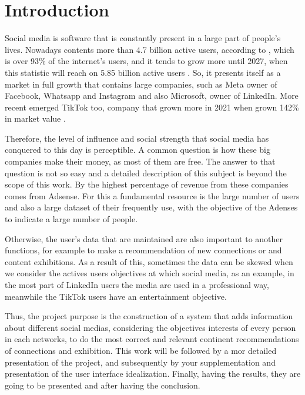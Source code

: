 \chapter{Introduction}
\label{cha:intro}

Social media is software that is constantly present in a large part of people's lives. Nowadays contents more than 4.7 billion active users, according to \cite{statista}, which is over 93\% of the internet's users, and it tends to grow more until 2027, when this statistic will reach on 5.85 billion active users \cite{statista_util_2027}. So, it presents itself as a market in full growth that contains large companies, such as Meta owner of Facebook, Whatsapp and Instagram and also Microsoft, owner of LinkedIn. More recent emerged TikTok too, company that grown more in 2021 when grown 142\% in market value \cite{growth_tiktok}.

Therefore, the level of influence and social strength that social media has conquered to this day is perceptible. A common question is how these big companies make their money, as most of them are free. The answer to that question is not so easy and a detailed description of this subject is beyond the scope of this work. By \cite{investopedia} the highest percentage of revenue from these companies comes from Adsense. For this a fundamental resource is the large number of users and also a large dataset of their frequently use, with the objective of the Adenses to indicate a large number of people.

Otherwise, the user’s data that are maintained are also important to another functions, for example to make a recommendation of new connections or and content exhibitions. As a result of this, sometimes the data can be skewed when we consider the actives users objectives at which social media, as an example, in the most part of LinkedIn users the media are used in a professional way, meanwhile the TikTok users have an entertainment objective.

Thus, the project purpose is the construction of a system that adds information about different social medias, considering the objectives interests of every person in each networks, to do the most correct and relevant continent recommendations of connections and exhibition. This work will be followed by a mor detailed presentation of the project, and subsequently by your supplementation and presentation of the user interface idealization. Finally, having the results, they are going to be presented and after having the conclusion.

